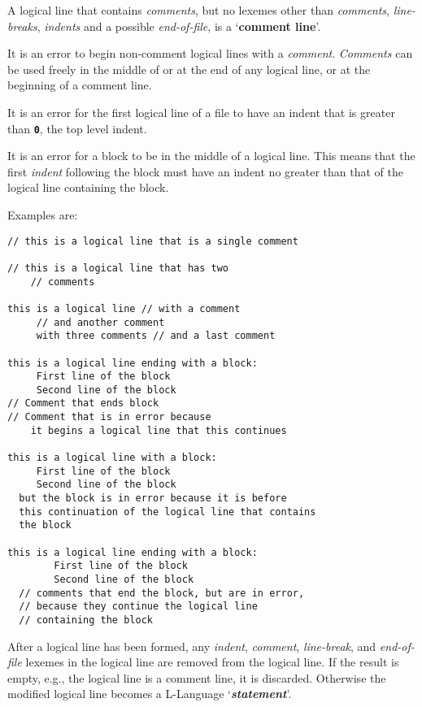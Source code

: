 \documentclass[12pt]{article}
\newcommand{\TT}[1]{{\tt \bfseries #1}}
\newcommand{\key}[1]{{\rm \bfseries #1}}
\newcommand{\emkey}[1]{{\em \bfseries #1}}
\newenvironment{indpar}[1][0.3in]%
	{\begin{list}{}%
		     {\setlength{\itemsep}{0in}%
		      \setlength{\topsep}{0in}%
		      \setlength{\parsep}{1ex}%
		      \setlength{\labelwidth}{#1}%
		      \setlength{\leftmargin}{#1}%
		      \addtolength{\leftmargin}{\labelsep}}%
	 \item}%
	{\end{list}}
\begin{document}
A logical line that contains {\em comments}, but no
lexemes other than {\em comments}, {\em line-breaks}, {\em indents}
and a possible {\em end-of-file}, is
a `\key{comment line}'.

It is an error to begin non-comment logical lines with
a {\em comment}.
{\em Comments} can be used freely in the middle of or at the
end of any logical line, or at the beginning of a comment line.

It is an error for the first logical line of a file
to have an indent that is greater than \TT{0}, the top level
indent.

It is an error for a block to be in the middle of a logical
line.  This means that the first {\em indent} following the
block must have an indent no greater than that of the logical
line containing the block.

Examples are:
\begin{indpar}\begin{verbatim}
// this is a logical line that is a single comment

// this is a logical line that has two
    // comments

this is a logical line // with a comment
     // and another comment
     with three comments // and a last comment

this is a logical line ending with a block:
     First line of the block
     Second line of the block
// Comment that ends block
// Comment that is in error because
    it begins a logical line that this continues

this is a logical line with a block:
     First line of the block
     Second line of the block
  but the block is in error because it is before
  this continuation of the logical line that contains
  the block

this is a logical line ending with a block:
        First line of the block
        Second line of the block
  // comments that end the block, but are in error,
  // because they continue the logical line
  // containing the block
\end{verbatim}\end{indpar}

After a logical line
has been formed, any {\em indent},
{\em comment}, {\em line-break}, and {\em end-of-file}
lexemes in the logical line
are removed from the logical line.  If the result is
empty, e.g., the logical line is a comment line, it is discarded.
Otherwise the
modified logical line becomes a L-Language `\emkey{statement}'.
\end{document}
